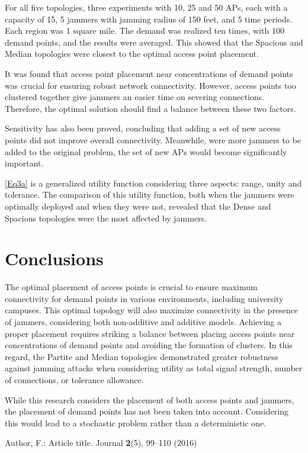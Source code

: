 \documentclass[runningheads]{llncs}
\begin{document}
	For all five topologies, three experiments with 10, 25 and 50 APs, each with a capacity of 15, 5 jammers with jamming radius of 150 feet, and 5 time periods. Each region was 1 square mile. The demand was realized ten times, with 100 demand points, and the results were averaged. This showed that the Spacious and Median topologies were closest to the optimal access point placement.
	
	It was found that access point placement near concentrations of demand points was crucial for ensuring robust network connectivity. However, access points too clustered together give jammers an easier time on severing connections. Therefore, the optimal solution should find a balance between these two factors. 
	
	Sensitivity has also been proved, concluding that adding a set of new access points did not improve overall connectivity. Meanwhile, were more jammers to be added to the original problem, the set of new APs would become significantly important.
	
	\ref{Eq3a} is a generalized utility function considering three aspects: range, unity and tolerance.
	 The comparison of this utility function, both when the jammers were optimally deployed and when they were not, revealed that the Dense and Spacious topologies were the most affected by jammers.
	
	
	\section{Conclusions}
	
	The optimal placement of access points is crucial to ensure maximum connectivity for demand points in various environments, including university campuses. This optimal topology will also maximize connectivity in the presence of jammers, considering both non-additive and additive models.
	Achieving a proper placement requires striking a balance between placing access points near concentrations of demand points and avoiding the formation of clusters.	In this regard, the Partite and Median topologies demonstrated greater robustness against jamming attacks when considering utility as total signal strength, number of connections, or tolerance allowance.
	
	While this research considers the placement of both access points and jammers, the placement of demand points has not been taken into account. Considering this would lead to a stochastic problem rather than a deterministic one.
	
	
	\begin{thebibliography}{8}
		Author, F.: Article title. Journal \textbf{2}(5), 99--110 (2016)
		
	\end{thebibliography}
\end{document}
